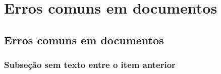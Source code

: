 %
%

\newcommand{\errado}[1]{\textbf{\textcolor{red}{#1}}}
\newcommand{\certo}[1]{\textbf{\textcolor{ForestGreen}{#1}}}
\newcommand{\erradocerto}[3]{\item #1:\begin{itemize}
    \item \errado{#2}
    \item \certo{#3}
\end{itemize}}
\newcommand{\erradoerradocerto}[4]{\item #1:\begin{itemize}
    \item \errado{#2}
    \item \errado{#3}
    \item \certo{#4}
\end{itemize}}
\newcommand{\erradocertocerto}[4]{\item #1:\begin{itemize}
    \item \errado{#2}
    \item \certo{#3}
    \item \certo{#4}
\end{itemize}}



\newcommand{\nomeDoCapitulo}{Erros comuns em documentos}
\chapter{\nomeDoCapitulo}
\label{erros-comuns-capitulo}


\section{\nomeDoCapitulo}
\label{erros-comuns}


\subsection{Subseção sem texto entre o item anterior}
\label{erros-comuns-sub1}


